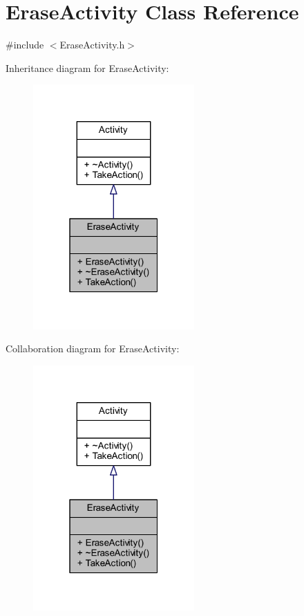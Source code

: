 \hypertarget{class_erase_activity}{}\section{Erase\+Activity Class Reference}
\label{class_erase_activity}


{\ttfamily \#include $<$Erase\+Activity.\+h$>$}



Inheritance diagram for Erase\+Activity\+:
\nopagebreak
\begin{figure}[H]
\begin{center}
\leavevmode
\includegraphics[width=175pt]{class_erase_activity__inherit__graph}
\end{center}
\end{figure}


Collaboration diagram for Erase\+Activity\+:
\nopagebreak
\begin{figure}[H]
\begin{center}
\leavevmode
\includegraphics[width=175pt]{class_erase_activity__coll__graph}
\end{center}
\end{figure}
